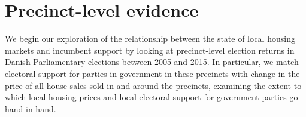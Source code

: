 \documentclass[12pt,a4paper]{article}
\begin{document}


\section{Precinct-level evidence}\label{precinctlevel}
We begin our exploration of the relationship between the state of local housing markets and incumbent support by looking at precinct-level election returns in Danish Parliamentary elections between 2005 and 2015. In particular, we match electoral support for parties in government in these precincts with change in the price of all house sales sold in and around the precincts, examining the extent to which local housing prices and local electoral support for government parties go hand in hand.
\end{document}
